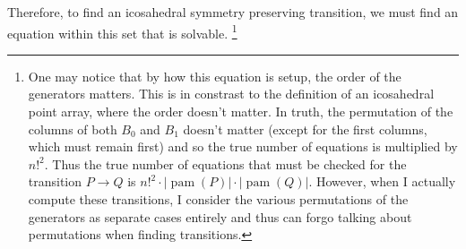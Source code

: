 \documentclass[a4paper,10pt]{article}
\let\oldfootnote\footnote
\renewcommand{\footnote}{\unskip\oldfootnote}
\theoremstyle{plain}
\theoremstyle{definition}
\theoremstyle{remark}
\newcommand\abs[1]{\left|#1\right|}
\DeclareMathOperator{\pam}{pam}
\begin{document}
Therefore, to find an icosahedral symmetry preserving transition, we must find an equation within this set that is solvable.
\footnote{
	One may notice that by how this equation is setup, the order of the generators matters.
	This is in constrast to the definition of an icosahedral point array, where the order doesn't matter.
	In truth, the permutation of the columns of both \( B_0 \) and \( B_1 \) doesn't matter (except for the first columns, which must remain first) and so the true number of equations is multiplied by \( n!^2 \).
	Thus the true number of equations that must be checked for the transition \( P \to Q \) is \( n!^2\cdot\abs{\pam(P)}\cdot\abs{\pam(Q)} \).
	However, when I actually compute these transitions, I consider the various permutations of the generators as separate cases entirely and thus can forgo talking about permutations when finding transitions.
	}
\end{document}
